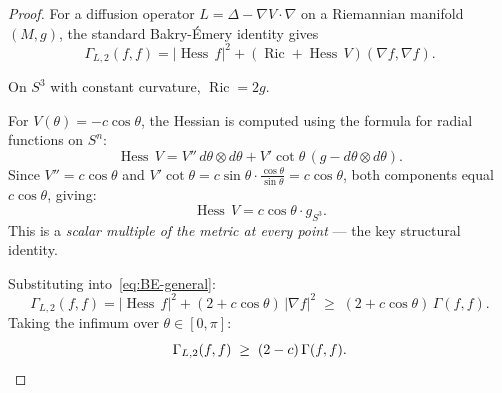 \documentclass[11pt,a4paper]{article}
\theoremstyle{plain}
\theoremstyle{definition}
\theoremstyle{remark}
\newcommand{\Hess}{\operatorname{Hess}}
\newcommand{\Ric}{\operatorname{Ric}}
\begin{document}
\begin{proof}
For a diffusion operator $L = \Delta - \nabla V \cdot \nabla$ on a
Riemannian manifold $(M,g)$, the standard Bakry-\'{E}mery identity
gives
\begin{equation}\label{eq:BE-general}
  \Gamma_{L,2}(f,f) = |\Hess\,f|^2 + (\Ric + \Hess\,V)(\nabla f,
  \nabla f).
\end{equation}

On $S^3$ with constant curvature, $\Ric = 2g$.

For $V(\theta) = -c\cos\theta$, the Hessian is computed using the
formula for radial functions on $S^n$:
\begin{equation}
  \Hess\,V = V''\,d\theta \otimes d\theta + V'\cot\theta\,(g -
  d\theta \otimes d\theta).
\end{equation}
Since $V'' = c\cos\theta$ and $V'\cot\theta = c\sin\theta \cdot
\frac{\cos\theta}{\sin\theta} = c\cos\theta$, both components equal
$c\cos\theta$, giving:
\begin{equation}
  \Hess\,V = c\cos\theta \cdot g_{S^3}.
\end{equation}
This is a \emph{scalar multiple of the metric at every point} --- the
key structural identity.

Substituting into~\eqref{eq:BE-general}:
\begin{equation}
  \Gamma_{L,2}(f,f) = |\Hess\,f|^2 + (2 + c\cos\theta)\,|\nabla f|^2
  \;\ge\; (2 + c\cos\theta)\,\Gamma(f,f).
\end{equation}
Taking the infimum over $\theta \in [0,\pi]$:
\begin{equation}
  \Gamma_{L,2}(f,f) \;\ge\; (2-c)\,\Gamma(f,f). \qedhere
\end{equation}
\end{proof}
\end{document}
